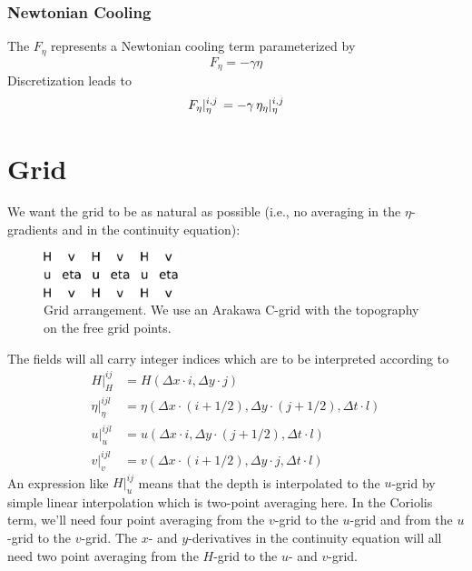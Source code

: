 \documentclass[a4paper]{article}
\begin{document}
\subsubsection{Newtonian Cooling}
The $F_\eta$ represents a Newtonian cooling term parameterized by
\begin{equation}
	F_\eta = -\gamma\eta
\end{equation}
Discretization leads to
\begin{equation}
	\,{F_\eta}\vert_{\eta}^{{i},{j}}\,=-\gamma\,{\eta_\eta}\vert_{\eta}^{{i},{j}}\,
\end{equation}


\section{Grid}

We want the grid to be as natural as possible (i.e., no averaging in the 
$\eta$-gradients and in the continuity equation):

\begin{figure}[h]
  \begin{center}
    \includegraphics[width=0.35\textwidth]{images/grid}
  \end{center}
  \caption{Grid arrangement. We use an Arakawa C-grid with the topography
    on the free grid points.  }
\end{figure}

The fields will all carry integer indices which are to be interpreted according to
\begin{align}
  H|_H^{ij} & = H(\Delta x \cdot i, \Delta y \cdot j) \\
  \eta|_\eta^{ijl} & = \eta(\Delta x \cdot (i+1/2), \Delta y \cdot (j+1/2), \Delta t \cdot l) \\
  u|_u^{ijl} & = u(\Delta x \cdot i, \Delta y \cdot (j+1/2), \Delta t \cdot l) \\
  v|_v^{ijl} & = v(\Delta x \cdot (i+1/2), \Delta y \cdot j, \Delta t \cdot l)
\end{align}
An expression like $H|_u^{ij}$ means that the depth is interpolated to the $u$-grid
by simple linear interpolation which is two-point averaging here. In the Coriolis term, 
we'll need four point averaging from the $v$-grid to the $u$-grid and from the $u$-grid
to the $v$-grid. The $x$- and $y$-derivatives in the continuity equation will all need 
two point averaging from the $H$-grid to the $u$- and $v$-grid.
\end{document}
